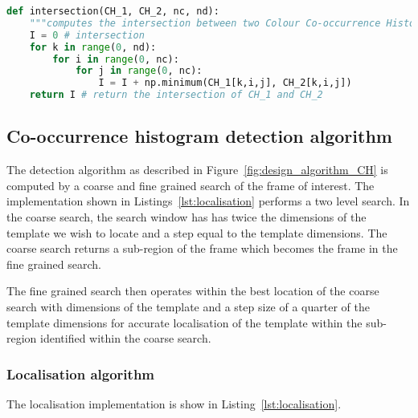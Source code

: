 \begin{lstlisting}[language=Python, caption={Computing intersection of two CCH's}, captionpos=b, label={lst:intersection}]
def intersection(CH_1, CH_2, nc, nd):
    """computes the intersection between two Colour Co-occurrence Histograms""" 
    I = 0 # intersection
    for k in range(0, nd):
        for i in range(0, nc):
            for j in range(0, nc):
                I = I + np.minimum(CH_1[k,i,j], CH_2[k,i,j])
    return I # return the intersection of CH_1 and CH_2
\end{lstlisting}

\subsection{Co-occurrence histogram detection algorithm}
The detection algorithm as described in Figure~\ref{fig:design_algorithm_CH}
is computed by a coarse and fine grained search of the frame of interest. 
The implementation shown in Listings~\ref{lst:localisation} performs a two level
search. In the coarse search, the search window has has twice the dimensions of the
template we wish to locate and a step equal to the template dimensions. The
coarse search returns a sub-region of the frame which becomes the frame in the
fine grained search. 

The fine grained search then operates within the best location of the coarse
search with dimensions of the template and a step size of a quarter of the
template dimensions for accurate localisation of the template within the
sub-region identified within the coarse search.

\subsubsection{Localisation algorithm}
The localisation implementation is show in Listing~\ref{lst:localisation}.

